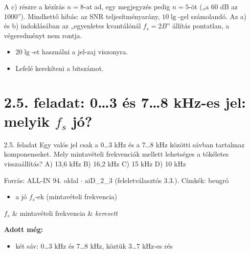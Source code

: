 \begin{center}\end{center}
\begin{figyelem}[Javítás]
A c) részre a kézírás $n=8$-at ad, egy megjegyzés pedig $n=5$-öt („a 60 dB az 1000”). Mindkettő hibás: az SNR teljesítményarány, $10\lg$-gel számolandó. Az a) és b) indoklásában az „egyenletes kvantálónál $f_s=2B$” állítás pontatlan, a végeredményt nem rontja.
\end{figyelem}
\begin{eredmeny}

\begin{center}\end{center}
\end{eredmeny}
\begin{figyelem}
\begin{itemize}
\item $20\lg$-et használni a jel-zaj viszonyra.
\item Lefelé kerekíteni a bitszámot.
\end{itemize}
\end{figyelem}


\section{\texorpdfstring{2.5. feladat: 0\ldots{}3 és 7\ldots{}8 kHz-es jel: melyik $f_s$ jó?}{2.5. feladat: 0…3 és 7…8 kHz-es jel: melyik fs jó?}}\label{ai2_05}
\setcounter{lepes}{0}
\begin{feladat}{2.5. feladat}
Egy valós jel csak a 0\ldots{}3 kHz és a 7\ldots{}8 kHz közötti sávban tartalmaz komponenseket. Mely mintavételi frekvenciák mellett lehetséges a tökéletes visszaállítás? A) 13,6 kHz B) 16,2 kHz C) 15 kHz D) 10 kHz

{\footnotesize\sffamily Forrás: ALL-IN 94. oldal $\cdot$ aiD\_2\_3 (feleletválasztós 3.3.). Címkék: beugró}
\end{feladat}
\begin{keresunk}
\begin{itemize}
\item a jó $f_s$-ek (mintavételi frekvencia)
\end{itemize}
\end{keresunk}
\begin{jeloles}
\begin{jeltabla}
$f_s$ & mintavételi frekvencia & \emph{keresett}\\
\end{jeltabla}
\par\smallskip\textbf{Adott még:}
\begin{itemize}
\item két sáv: 0\ldots{}3 kHz és 7\ldots{}8 kHz, köztük 3\ldots{}7 kHz-es rés
\end{itemize}
\end{jeloles}

